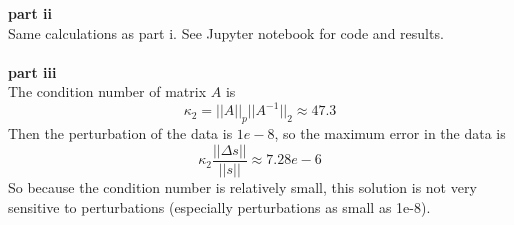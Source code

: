 \documentclass{article} %
\begin{document}
\textbf{part ii} \\
Same calculations as part i.  See Jupyter notebook for code and results. \\
\\

\textbf{part iii} \\
The condition number of matrix $A$ is 
\begin{equation*}
\kappa_2 = ||A||_p ||A^{-1}||_2 \approx 47.3
\end{equation*}
Then the perturbation of the data is $1e-8$, so the maximum error in the data is
\begin{equation*}
\kappa_2 \frac{||\Delta s||}{||s||} \approx 7.28e-6
\end{equation*}
So because the condition number is relatively small, this solution is not very sensitive to perturbations (especially perturbations as small as 1e-8).
\end{document}

